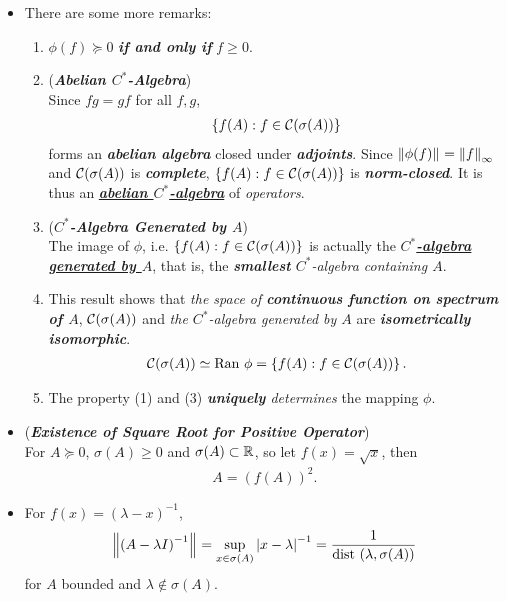 \documentclass[11pt]{article}
\begin{document}
\begin{itemize}
\item \begin{remark}
There are some more remarks:
\begin{enumerate}
\item $\phi(f) \succeq 0$  \emph{\textbf{if and only if}} $f \ge 0$.
\item (\textbf{\emph{Abelian $C^{*}$-Algebra}})\\
 Since $fg = gf$ for all $f, g$, 
\begin{align*}
\left\{f(A): f \in {\mathcal C}(\sigma(A))\right\}
\end{align*} forms an \emph{\textbf{abelian algebra}} closed under \emph{\textbf{adjoints}}.  Since  $\left\|\phi(f)\right\|_{} = \left\|f\right\|_{\infty}$  and ${\mathcal C}(\sigma(A))$ is \emph{\textbf{complete}},  $\left\{f(A): f \in {\mathcal C}(\sigma(A))\right\}$ is \emph{\textbf{norm-closed}}. It is thus an \underline{\emph{\textbf{abelian $C^{*}$-algebra}}} of 
\emph{operators}.  
\item  (\textbf{\emph{$C^{*}$-Algebra Generated by $A$}})\\
 The image of $\phi$, i.e. $\left\{f(A): f \in {\mathcal C}(\sigma(A))\right\}$ is actually the \underline{\emph{\textbf{$C^{*}$-algebra generated by $A$}}}, that is, the \emph{\textbf{smallest} $C^{*}$-algebra containing $A$}. 
 
 \item This result shows that \emph{the space of \textbf{continuous function on spectrum of $A$}}, ${\mathcal C}(\sigma(A))$ and \emph{the $C^{*}$-algebra generated by $A$} are \emph{\textbf{isometrically isomorphic}}.
 \begin{align*}
 {\mathcal C}(\sigma(A)) \simeq \text{Ran }\phi = \left\{f(A): f \in {\mathcal C}(\sigma(A))\right\}.
 \end{align*}
 
 \item The property (1) and (3) \emph{\textbf{uniquely} determines} the mapping $\phi$.
\end{enumerate}
\end{remark}

\item \begin{example} (\emph{\textbf{Existence of Square Root for Positive Operator}})\\
For $A \succeq 0$, $\sigma(A) \ge 0$ and $\sigma(A) \subset {\mathbb R}$, so let $f(x) = \sqrt{x}$, then
\begin{align*}
A = (f(A))^2.
\end{align*}
\end{example}

\item \begin{example}
For $f(x) = (\lambda  - x)^{-1}$,
\begin{align*}
\left\|\left(A - \lambda I\right)^{-1}\right\|_{} = \sup_{x \in \sigma(A)}\left\lvert x - \lambda  \right\rvert^{-1} = \frac{1}{\text{dist }(\lambda, \sigma(A))}
\end{align*} for $A$ bounded and $\lambda \not\in \sigma(A)$.
\end{example}


\end{itemize}
\end{document}
